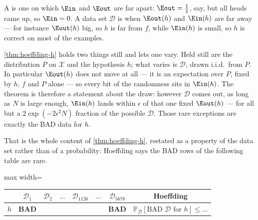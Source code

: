 \begin{definition}\label{def:bad}
    A  is one on which \(\Ein\) and \(\Eout\) are far apart:
    \(\Eout = \frac{1}{2}\), say, but all heads came up, so \(\Ein = 0\).
    A data set \(\mathcal{D}\) is  when
    \(\Eout(h)\) and \(\Ein(h)\) are far away --- for instance \(\Eout(h)\) big,
    so \(h\) is far from \(f\), while \(\Ein(h)\) is small, so \(h\) is correct
    on most of the examples.
\end{definition}

\begin{intuition}
    \autoref{thm:hoeffding-h} holds two things still and lets one vary. Held
    still are the distribution \(P\) on \(\mathcal{X}\) and the hypothesis
    \(h\); what varies is \(\mathcal{D}\), drawn i.i.d.\ from \(P\). In
    particular \(\Eout(h)\) does not move at all --- it is an expectation over
    \(P\), fixed by \(h\), \(f\) and \(P\) alone --- so every bit of the
    randomness sits in \(\Ein(h)\). The theorem is therefore a statement about
    the draw: however \(\mathcal{D}\) comes out, as long as \(N\) is large
    enough, \(\Ein(h)\) lands within \(\epsilon\) of that one fixed
    \(\Eout(h)\) --- for all but a \(2 \exp(-2 \epsilon^2 N)\) fraction of
    the possible \(\mathcal{D}\). Those rare exceptions are exactly the BAD
    data for \(h\).
\end{intuition}

That is the whole content of \autoref{thm:hoeffding-h}, restated as a property
of the data set rather than of a probability: Hoeffding says the BAD rows of the
following table are rare.

\begin{center}
    \begin{adjustbox}{max width=\textwidth}
        \solidrules
        \begin{tabular}{@{}c|cccccc|c@{}}
            \toprule
            & \(\mathcal{D}_1\) & \(\mathcal{D}_2\) & \(\dots\)
            & \(\mathcal{D}_{1126}\) & \(\dots\) & \(\mathcal{D}_{5678}\)
            & Hoeffding\\
            \midrule
            \(h\) & \textcolor{red!75!black}{\textbf{BAD}} & & & & &
            \textcolor{red!75!black}{\textbf{BAD}} &
            \(\mathbb{P}_{\mathcal{D}}\left[ \text{BAD } \mathcal{D}
            \text{ for } h \right] \le \dots\)\\
            \bottomrule
        \end{tabular}
    \end{adjustbox}
\end{center}

